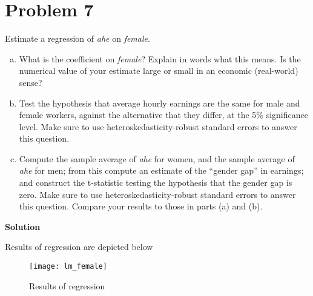\documentclass[a4paper]{article}
\begin{document}
\section*{Problem 7}
Estimate a regression of \textit{ahe} on \textit{female}.
\begin{enumerate}[a.]
\item What is the coefficient on \textit{female}? Explain in words what this means. Is the numerical
value of your estimate large or small in an economic (real-world) sense?
\item Test the hypothesis that average hourly earnings are the same for male and female
workers, against the alternative that they differ, at the 5\% significance level. Make sure to use
heteroskedasticity-robust standard errors to answer this question.
\item Compute the sample average of \textit{ahe} for women, and the sample average of \textit{ahe} for men;
from this compute an estimate of the “gender gap” in earnings; and construct the t-statistic
testing the hypothesis that the gender gap is zero. Make sure to use heteroskedasticity-robust
standard errors to answer this question. Compare your results to those in parts (a) and (b).

\end{enumerate}



\textbf{Solution}


Results of regression are depicted below



\begin{figure}[H]
	\centering
	\texttt{[image: lm\_female]}
	\caption{Results of regression}
\end{figure}
\end{document}
